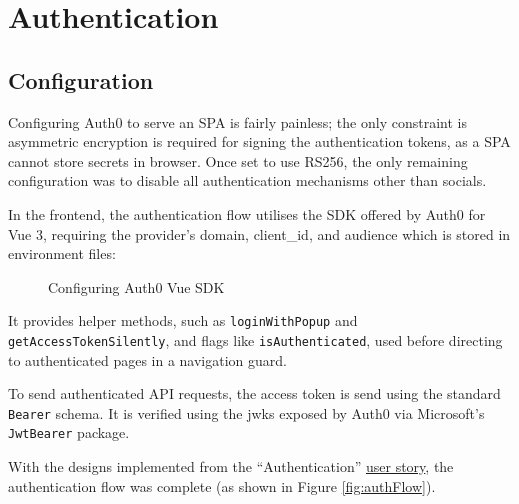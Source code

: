 \section{Authentication}

\subsection{Configuration}

Configuring Auth0 to serve an SPA is fairly painless; the
only constraint is asymmetric encryption is required for
signing the authentication tokens, as a SPA cannot store
secrets in browser.
Once set to use RS256, the only remaining configuration was
to disable all authentication mechanisms other than
socials.

In the frontend, the authentication flow utilises the SDK
offered by Auth0 for Vue 3, requiring the provider's
domain, client\_id, and audience which is stored in
environment files: 

\begin{figure}[H] 

  \centering 

  \small 

  

  \caption{Configuring Auth0 Vue SDK} 

\end{figure} 

It provides helper methods, such as
\lstinline{loginWithPopup} and
\lstinline{getAccessTokenSilently}, and flags like
\lstinline{isAuthenticated}, used before directing to
authenticated pages in a navigation guard.

To send authenticated API requests, the access token is
send using the standard \lstinline{Bearer} schema.
It is verified using the \gls{jwks} exposed by Auth0 via
Microsoft's \lstinline{JwtBearer} package.

With the designs implemented from the
\enquote{Authentication} \hyperref[ss:stories]{user story},
the authentication flow was complete (as shown in Figure
\ref{fig:authFlow}).

